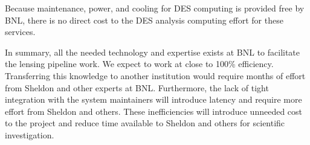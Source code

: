 \documentclass[12pt]{article}
\begin{document}
Because maintenance, power, and cooling for DES computing is provided free by
BNL, there is no direct cost to the DES analysis computing effort for these
services.

In summary, all the needed technology and expertise exists at BNL to facilitate
the lensing pipeline work.  We expect to work at close to 100\% efficiency.
Transferring this knowledge to another institution would require months of
effort from Sheldon and other experts at BNL.  Furthermore, the lack of tight
integration with the system maintainers will introduce latency and require more
effort from Sheldon and others.  These inefficiencies will introduce unneeded
cost to the project and reduce time available to Sheldon and others for
scientific investigation.
\end{document}
